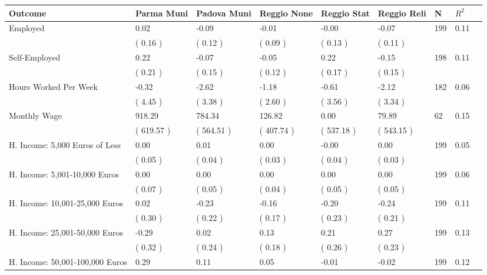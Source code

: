 \begin{tabular}{L{6.2cm} C{1.8cm} C{1.8cm} C{1.8cm} C{1.8cm} C{1.8cm} C{1.8cm} C{0.3cm} C{0.3cm}}
\toprule
 \textbf{Outcome} & \textbf{Parma Muni} & \textbf{Padova Muni} & \textbf{Reggio None} & \textbf{Reggio Stat} & \textbf{Reggio Reli} & \textbf{N} & \textbf{$ R^2$} \\
\midrule
Employed &      0.02 &     -0.09 &     -0.01 &     -0.00 &     -0.07  & 199 &       0.11 \\ 
 & (     0.16 ) & (     0.12 ) & (     0.09 ) & (     0.13 ) & (     0.11 )  & \\
Self-Employed &      0.22 &     -0.07 &     -0.05 &      0.22 &     -0.15  & 198 &       0.11 \\ 
 & (     0.21 ) & (     0.15 ) & (     0.12 ) & (     0.17 ) & (     0.15 )  & \\
Hours Worked Per Week &     -0.32 &     -2.62 &     -1.18 &     -0.61 &     -2.12  & 182 &       0.06 \\ 
 & (     4.45 ) & (     3.38 ) & (     2.60 ) & (     3.56 ) & (     3.34 )  & \\
Monthly Wage &    918.29 &    784.34 &    126.82 &      0.00 &     79.89  & 62 &       0.15 \\ 
 & (   619.57 ) & (   564.51 ) & (   407.74 ) & (   537.18 ) & (   543.15 )  & \\
H. Income: 5,000 Euros of Less &      0.00 &      0.01 &      0.00 &     -0.00 &      0.00  & 199 &       0.05 \\ 
 & (     0.05 ) & (     0.04 ) & (     0.03 ) & (     0.04 ) & (     0.03 )  & \\
H. Income: 5,001-10,000 Euros &      0.00 &      0.00 &      0.00 &      0.00 &      0.00  & 199 &       0.06 \\ 
 & (     0.07 ) & (     0.05 ) & (     0.04 ) & (     0.05 ) & (     0.05 )  & \\
H. Income: 10,001-25,000 Euros &      0.02 &     -0.23 &     -0.16 &     -0.20 &     -0.24  & 199 &       0.11 \\ 
 & (     0.30 ) & (     0.22 ) & (     0.17 ) & (     0.23 ) & (     0.21 )  & \\
H. Income: 25,001-50,000 Euros &     -0.29 &      0.02 &      0.13 &      0.21 &      0.27  & 199 &       0.13 \\ 
 & (     0.32 ) & (     0.24 ) & (     0.18 ) & (     0.26 ) & (     0.23 )  & \\
H. Income: 50,001-100,000 Euros &      0.29 &      0.11 &      0.05 &     -0.01 &     -0.02  & 199 &       0.12 \\ 

\end{tabular}
